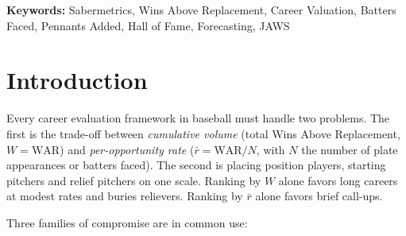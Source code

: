 \documentclass[11pt,letterpaper]{article}
\theoremstyle{plain}
\theoremstyle{definition}
\theoremstyle{remark}
\newcommand{\WAR}{\mathrm{WAR}}
\begin{document}
\vspace{0.5em}
\noindent\textbf{Keywords:} Sabermetrics, Wins Above Replacement, Career Valuation, Batters Faced, Pennants Added, Hall of Fame, Forecasting, JAWS

\section{Introduction}

Every career evaluation framework in baseball must handle two problems. The first is the trade-off between \emph{cumulative volume} (total Wins Above Replacement, $W = \WAR$) and \emph{per-opportunity rate} ($\bar r = \WAR / N$, with $N$ the number of plate appearances or batters faced). The second is placing position players, starting pitchers and relief pitchers on one scale. Ranking by $W$ alone favors long careers at modest rates and buries relievers. Ranking by $\bar r$ alone favors brief call-ups.

Three families of compromise are in common use:
\end{document}
